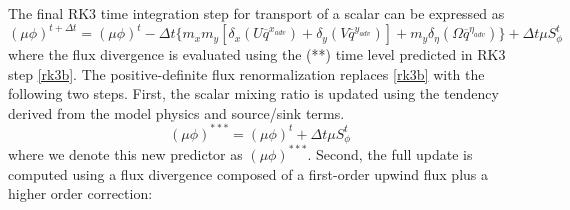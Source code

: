 The final RK3 time integration step for transport of a scalar can be
expressed as
%
\begin{equation}
(\mu\phi)^{t+\Delta t} = (\mu\phi)^{t} - {\Delta t}\bigl\{
m_x m_y [\delta_x (U \overline{q}^{x_{adv}}) 
+ \delta_y (V\overline{q}^{y_{adv}})] 
+ m_y \delta_\eta
(\Omega \overline{q}^{\eta_{adv}})\bigr\}
+ \Delta t \mu S_\phi^t
\label{rk3c-scalar}
\end{equation}
%
\noindent
where the flux divergence is evaluated using the (**) time level
predicted in RK3 step \eqref{rk3b}.  The positive-definite flux
renormalization replaces \eqref{rk3b} with the following two steps.  First,
the scalar mixing ratio is updated using the tendency derived from the
model physics and source/sink terms.
%
\begin{equation}
(\mu\phi)^{***} = (\mu\phi)^{t} + {\Delta t} \mu S_\phi^t
\label{scalar-source-update}
\end{equation}
%
where we denote this new predictor as $(\mu\phi)^{***}$.  Second, the
full update is computed using a
flux divergence composed of a first-order upwind flux plus a
higher order correction:


